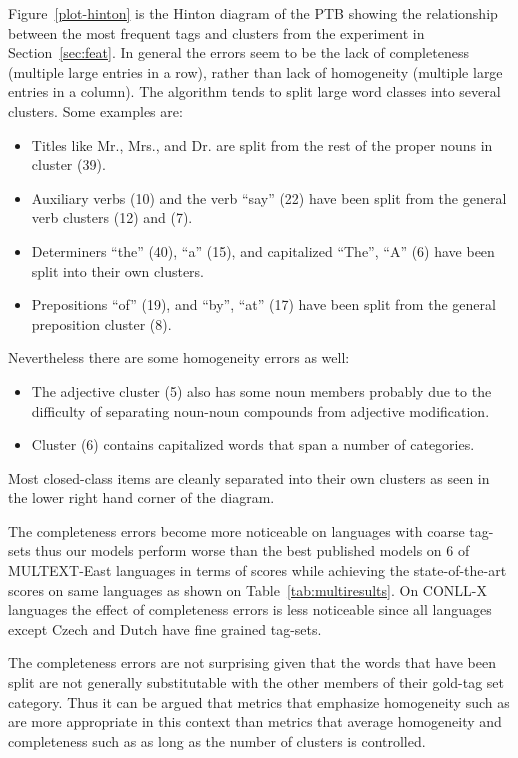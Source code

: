 Figure~\ref{plot-hinton} is the Hinton diagram of the PTB showing the
relationship between the most frequent tags and clusters from the
experiment in Section~\ref{sec:feat}.  In general the errors seem to
be the lack of completeness (multiple large entries in a row), rather
than lack of homogeneity (multiple large entries in a column).  The
algorithm tends to split large word classes into several clusters.
Some examples are:
\begin{itemize}
\item Titles like Mr., Mrs., and Dr. are split from the rest of the
  proper nouns in cluster (39).
\item Auxiliary verbs (10) and the verb ``say'' (22) have been split
  from the general verb clusters (12) and (7).
\item Determiners ``the'' (40), ``a'' (15), and capitalized
  ``The'', ``A'' (6) have been split into their own clusters.
\item Prepositions ``of'' (19), and ``by'', ``at'' (17) have been
  split from the general preposition cluster (8).
\end{itemize}
Nevertheless there are some homogeneity errors as well:
\begin{itemize} 
\item The adjective cluster (5) also has some noun members probably
  due to the difficulty of separating noun-noun compounds from
  adjective modification.
\item Cluster (6) contains capitalized words that span a number of
  categories.
\end{itemize}
Most closed-class items are cleanly separated into their own clusters
as seen in the lower right hand corner of the diagram. 

The completeness errors become more noticeable on languages with
coarse tag-sets thus our models perform worse than the best published
models on 6 of MULTEXT-East languages in terms of \vm scores while
achieving the state-of-the-art \mto scores on same languages as shown
on Table~\ref{tab:multiresults}.  On CONLL-X languages the effect of
completeness errors is less noticeable since all languages except
Czech and Dutch have fine grained tag-sets.

The completeness errors are not surprising given that the words that
have been split are not generally substitutable with the other members
of their gold-tag set category.  Thus it can be argued that metrics
that emphasize homogeneity such as \mto are more appropriate in this
context than metrics that average homogeneity and completeness such as
\vm as long as the number of clusters is controlled.

